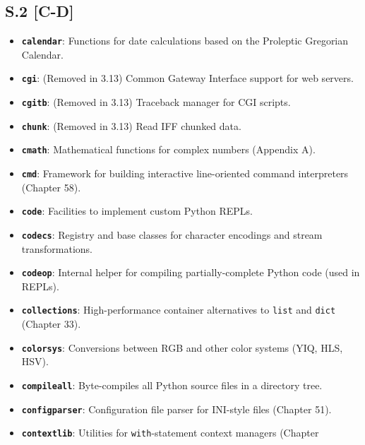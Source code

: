 \hypertarget{s.2-c-d}{%
\subsection{S.2 {[}C-D{]}}\label{s.2-c-d}}

\begin{itemize}
\tightlist
\item
  \textbf{\passthrough{\lstinline!calendar!}}: Functions for date
  calculations based on the Proleptic Gregorian Calendar.
\item
  \textbf{\passthrough{\lstinline!cgi!}}: (Removed in 3.13) Common
  Gateway Interface support for web servers.
\item
  \textbf{\passthrough{\lstinline!cgitb!}}: (Removed in 3.13) Traceback
  manager for CGI scripts.
\item
  \textbf{\passthrough{\lstinline!chunk!}}: (Removed in 3.13) Read IFF
  chunked data.
\item
  \textbf{\passthrough{\lstinline!cmath!}}: Mathematical functions for
  complex numbers (Appendix A).
\item
  \textbf{\passthrough{\lstinline!cmd!}}: Framework for building
  interactive line-oriented command interpreters (Chapter 58).
\item
  \textbf{\passthrough{\lstinline!code!}}: Facilities to implement
  custom Python REPLs.
\item
  \textbf{\passthrough{\lstinline!codecs!}}: Registry and base classes
  for character encodings and stream transformations.
\item
  \textbf{\passthrough{\lstinline!codeop!}}: Internal helper for
  compiling partially-complete Python code (used in REPLs).
\item
  \textbf{\passthrough{\lstinline!collections!}}: High-performance
  container alternatives to \passthrough{\lstinline!list!} and
  \passthrough{\lstinline!dict!} (Chapter 33).
\item
  \textbf{\passthrough{\lstinline!colorsys!}}: Conversions between RGB
  and other color systems (YIQ, HLS, HSV).
\item
  \textbf{\passthrough{\lstinline!compileall!}}: Byte-compiles all
  Python source files in a directory tree.
\item
  \textbf{\passthrough{\lstinline!configparser!}}: Configuration file
  parser for INI-style files (Chapter 51).
\item
  \textbf{\passthrough{\lstinline!contextlib!}}: Utilities for
  \passthrough{\lstinline!with!}-statement context managers (Chapter

\end{itemize}
